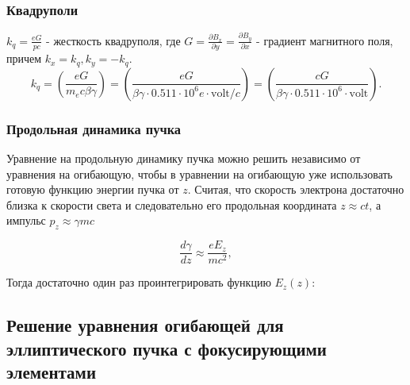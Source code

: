 \documentclass[11pt]{article}
\begin{document}
\hypertarget{ux43aux432ux430ux434ux440ux443ux43fux43eux43bux438}{%
\subsubsection{Квадруполи}\label{ux43aux432ux430ux434ux440ux443ux43fux43eux43bux438}}

\(k_q = \displaystyle\frac{eG}{pc}\) - жесткость квадруполя, где
\(G = \displaystyle\frac{\partial B_x}{\partial y} = \displaystyle\frac{\partial B_y}{\partial x}\)
- градиент магнитного поля, причем \(k_x = k_q, k_y = -k_q.\) \[
k_q = \left ( \frac{eG}{m_ec\beta\gamma} \right ) = \left ( \frac{eG}{\beta\gamma\cdot 0.511\cdot 10^6 e \cdot \mathrm{volt}/c} \right ) =
\left ( \frac{cG}{\beta\gamma\cdot 0.511\cdot 10^6 \cdot \mathrm{volt}} \right ).
\]

    \hypertarget{ux43fux440ux43eux434ux43eux43bux44cux43dux430ux44f-ux434ux438ux43dux430ux43cux438ux43aux430-ux43fux443ux447ux43aux430}{%
\subsubsection{Продольная динамика
пучка}\label{ux43fux440ux43eux434ux43eux43bux44cux43dux430ux44f-ux434ux438ux43dux430ux43cux438ux43aux430-ux43fux443ux447ux43aux430}}

    Уравнение на продольную динамику пучка можно решить независимо от
уравнения на огибающую, чтобы в уравнении на огибающую уже использовать
готовую функцию энергии пучка от \(z\). Считая, что скорость электрона
достаточно близка к скорости света и следовательно его продольная
координата \(z \approx ct\), а импульс \(p_z \approx \gamma mc\)

    \[
\frac{d\gamma}{dz} \approx \frac{eE_z}{mc^2},
\]

    Тогда достаточно один раз проинтегрировать функцию \(E_z(z)\):

    \hypertarget{ux440ux435ux448ux435ux43dux438ux435-ux443ux440ux430ux432ux43dux435ux43dux438ux44f-ux43eux433ux438ux431ux430ux44eux449ux435ux439-ux434ux43bux44f-ux44dux43bux43bux438ux43fux442ux438ux447ux435ux441ux43aux43eux433ux43e-ux43fux443ux447ux43aux430-ux441-ux444ux43eux43aux443ux441ux438ux440ux443ux44eux449ux438ux43cux438-ux44dux43bux435ux43cux435ux43dux442ux430ux43cux438}{%
\subsection{Решение уравнения огибающей для эллиптического пучка с
фокусирующими
элементами}\label{ux440ux435ux448ux435ux43dux438ux435-ux443ux440ux430ux432ux43dux435ux43dux438ux44f-ux43eux433ux438ux431ux430ux44eux449ux435ux439-ux434ux43bux44f-ux44dux43bux43bux438ux43fux442ux438ux447ux435ux441ux43aux43eux433ux43e-ux43fux443ux447ux43aux430-ux441-ux444ux43eux43aux443ux441ux438ux440ux443ux44eux449ux438ux43cux438-ux44dux43bux435ux43cux435ux43dux442ux430ux43cux438}}
\end{document}
